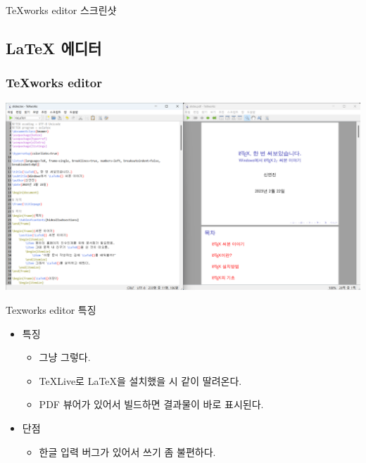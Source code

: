 \documentclass{beamer}
\begin{document}
\begin{frame}[allowframebreaks]{TeXworks editor 스크린샷}
    \subsection{\LaTeX{} 에디터}
    \subsubsection{TeXworks editor}
    \begin{center}
        \includegraphics[scale=0.25]{images/texworks_editor.png}
    \end{center}
\end{frame}
\begin{frame}{Texworks editor 특징}
    \begin{itemize}
        \item 특징
        \begin{itemize}
            \item 그냥 그렇다.
            \item TeXLive로 \LaTeX{}을 설치했을 시 같이 딸려온다.
            \item PDF 뷰어가 있어서 빌드하면 결과물이 바로 표시된다.
        \end{itemize}
        \item 단점
        \begin{itemize}
            \item 한글 입력 버그가 있어서 쓰기 좀 불편하다.
        \end{itemize}
    \end{itemize}
\end{frame}
\end{document}
